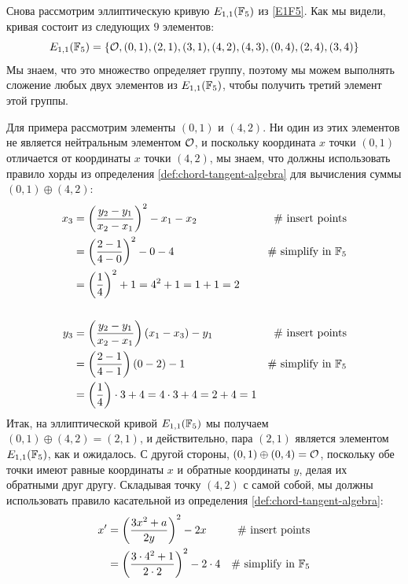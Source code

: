 \begin{example}\label{ex:01+42}
Снова рассмотрим эллиптическую кривую $E_{1,1}(\mathbb{F}_5)$ из \examplename{} \ref{E1F5}. Как мы видели, кривая состоит из следующих $9$ элементов:
\begin{equation}
E_{1,1}(\mathbb{F}_5) = \{\mathcal{O}, (0,1),(2,1),(3,1),(4,2),(4,3),(0,4),(2,4),(3,4)\}
\end{equation}
Мы знаем, что это множество определяет группу, поэтому мы можем выполнять сложение любых двух элементов из $E_{1,1}(\mathbb{F}_5)$, чтобы получить третий элемент этой группы. 

Для примера рассмотрим элементы $(0,1)$ и $(4,2)$. Ни один из этих элементов не является нейтральным элементом $\mathcal{O}$, и поскольку координата $x$ точки $(0,1)$ отличается от координаты $x$ точки $(4,2)$, мы знаем, что должны использовать правило хорды из определения \ref{def:chord-tangent-algebra} для вычисления суммы $(0,1)\oplus (4,2)$:
\begin{align*}
x_3  & = \left(\frac{y_2-y_1}{x_2-x_1}\right)^2 -x_1-x_2 & \text{\# insert points}\\
     & = \left(\frac{2-1}{4-0}\right)^2 -0-4  & \text{\# simplify in } \mathbb{F}_5\\
     & = \left(\frac{1}{4}\right)^2 +1
       = 4^2 +1
       = 1 +1 
       = 2
\\
\\
y_3  & = \left(\frac{y_2-y_1}{x_2-x_1} \right)\left(x_1-x_3\right) - y_1  & \text{\# insert points}\\     
     & = \left(\frac{2-1}{4-1} \right)\left(0-2\right) - 1   & \text{\# simplify in } \mathbb{F}_5\\    
     & = \left(\frac{1}{4} \right)\cdot 3 + 4   
       = 4\cdot 3 + 4
       = 2 + 4
       = 1          
\end{align*} 
Итак, на эллиптической кривой $E_{1,1}(\mathbb{F}_5)$ мы получаем $(0,1)\oplus (4,2) =(2,1)$, и действительно, пара $(2,1)$ является элементом $E_{1,1}(\mathbb{F}_5)$, как и ожидалось. С другой стороны, $(0,1)\oplus (0,4) =\mathcal{O}$, поскольку обе точки имеют равные координаты $x$ и обратные координаты $y$, делая их обратными друг другу. Складывая точку $(4,2)$ с самой собой, мы должны использовать правило касательной из определения \ref{def:chord-tangent-algebra}:
\begin{align*}
x'  & = \left(\frac{3x^2+a}{2y}\right)^2 -2x   & \text{\# insert points}\\
    & = \left(\frac{3\cdot 4^2+1}{2\cdot 2}\right)^2 -2\cdot 4 & \text{\# simplify in } \F_5 \\

\end{align*}
\end{example}

